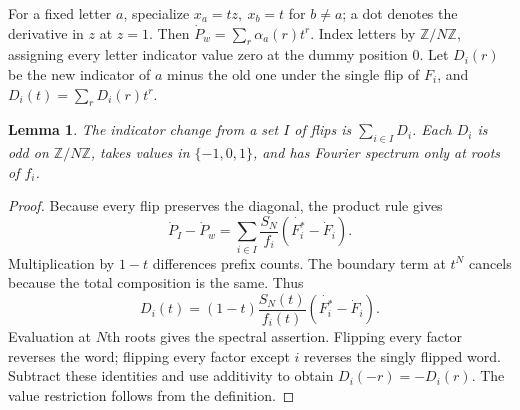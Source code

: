 \documentclass[11pt]{article}
\newtheorem{lemma}[theorem]{Lemma}
\newcommand{\Z}{\mathbb Z}
\begin{document}
For a fixed letter \(a\), specialize \(x_a=tz,\ x_b=t\) for \(b\ne a\); a dot denotes the derivative in \(z\) at \(z=1\). Then \(\dot P_w=\sum_r\alpha_a(r)t^r\). Index letters by \(\Z/N\Z\), assigning every letter indicator value zero at the dummy position 0. Let \(D_i(r)\) be the new indicator of \(a\) minus the old one under the single flip of \(F_i\), and \(D_i(t)=\sum_r D_i(r)t^r\).
\begin{lemma}\label{linear}
The indicator change from a set \(I\) of flips is \(\sum_{i\in I}D_i\). Each \(D_i\) is odd on \(\Z/N\Z\), takes values in \(\{-1,0,1\}\), and has Fourier spectrum only at roots of \(f_i\).
\end{lemma}
\begin{proof}
Because every flip preserves the diagonal, the product rule gives
\[
 \dot P_I-\dot P_w=\sum_{i\in I}\frac{S_N}{f_i}
                 (\dot{F_i^*}-\dot F_i).
\]
Multiplication by \(1-t\) differences prefix counts. The boundary term at \(t^N\) cancels because the total composition is the same. Thus
\[
 D_i(t)=(1-t)\frac{S_N(t)}{f_i(t)}(\dot{F_i^*}-\dot F_i).
\]
Evaluation at \(N\)th roots gives the spectral assertion. Flipping every factor reverses the word; flipping every factor except \(i\) reverses the singly flipped word. Subtract these identities and use additivity to obtain \(D_i(-r)=-D_i(r)\). The value restriction follows from the definition.
\end{proof}
\end{document}
